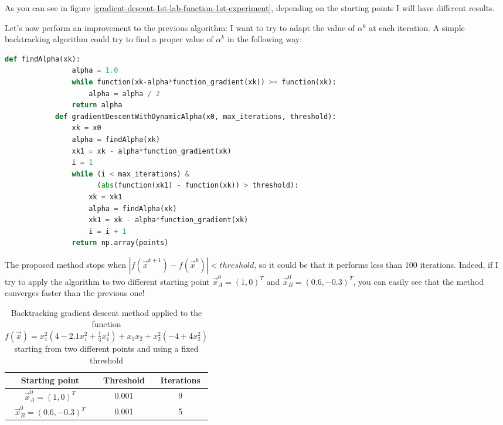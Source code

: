         As you can see in figure \ref{gradient-descent-1st-lab-function-1st-experiment}, depending on the starting points I will have different results.\par
        Let's now perform an improvement to the previous algorithm: I want to try to adapt the value of \(\alpha^k\) at each iteration. A simple backtracking algorithm could try to find a proper value of \(\alpha^k\) in the following way:
        \begin{lstlisting}[language=Python]
            def findAlpha(xk):
                alpha = 1.0
                while function(xk-alpha*function_gradient(xk)) >= function(xk):
                    alpha = alpha / 2
                return alpha
            def gradientDescentWithDynamicAlpha(x0, max_iterations, threshold):
                xk = x0
                alpha = findAlpha(xk)
                xk1 = xk - alpha*function_gradient(xk)
                i = 1
                while (i < max_iterations) &
                      (abs(function(xk1) - function(xk)) > threshold):
                    xk = xk1
                    alpha = findAlpha(xk)
                    xk1 = xk - alpha*function_gradient(xk)
                    i = i + 1
                return np.array(points)
        \end{lstlisting}
        The proposed method stops when \(|f(\vec{x}^{k+1}) - f(\vec{x}^k)| < threshold\), so it could be that it performs less than 100 iterations. Indeed, if I try to apply the algorithm to two different starting point \(\vec{x}_A^0 = (1,0)^T\) and \(\vec{x}_B^0 = (0.6, -0.3)^T\), you can easily see that the method converges faster than the previous one!
        \begin{table}
            \centering
            \begin{tabu}{| c | c | c |}
                \hline
                Starting point &                    Threshold &     Iterations \\ \hline \hline
                \(\vec{x}_A^0 = (1,0)^T\) &         0.001 &         9 \\ \hline
                \(\vec{x}_B^0 = (0.6, -0.3)^T\) &   0.001 &         5 \\ \hline
            \end{tabu}
            \caption{Backtracking gradient descent method applied to the function \(f(\vec{x}) = x_1^2(4 - 2.1x_1^2 + \frac{1}{3}x_1^4) + x_1x_2 + x_2^2(-4 + 4x_2^2)\) starting from two different points and using a fixed threshold}
            \label{gradient-descent-1st-lab-function-2nd-experiment-results}
        \end{table}
